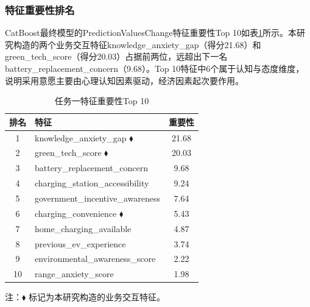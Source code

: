 \subsubsection{特征重要性排名}

CatBoost最终模型的PredictionValuesChange特征重要性Top 10如表\ref{tab:t1_import}所示。本研究构造的两个业务交互特征knowledge\_anxiety\_gap（得分21.68）和green\_tech\_score（得分20.03）占据前两位，远超出下一名battery\_replacement\_concern（9.68）。Top 10特征中6个属于认知与态度维度，说明采用意愿主要由心理认知因素驱动，经济因素起次要作用。

\begin{table}[H]
\centering
\caption{任务一特征重要性Top 10}
\label{tab:t1_import}
\begin{tabular}{clc}
\toprule
\textbf{排名} & \textbf{特征} & \textbf{重要性} \\
\midrule
1 & knowledge\_anxiety\_gap $\blacklozenge$ & 21.68 \\
2 & green\_tech\_score $\blacklozenge$ & 20.03 \\
3 & battery\_replacement\_concern & 9.68 \\
4 & charging\_station\_accessibility & 9.24 \\
5 & government\_incentive\_awareness & 7.64 \\
6 & charging\_convenience $\blacklozenge$ & 5.43 \\
7 & home\_charging\_available & 4.87 \\
8 & previous\_ev\_experience & 3.74 \\
9 & environmental\_awareness\_score & 2.22 \\
10 & range\_anxiety\_score & 1.98 \\
\bottomrule
\end{tabular}
\end{table}
注：$\blacklozenge$ 标记为本研究构造的业务交互特征。
